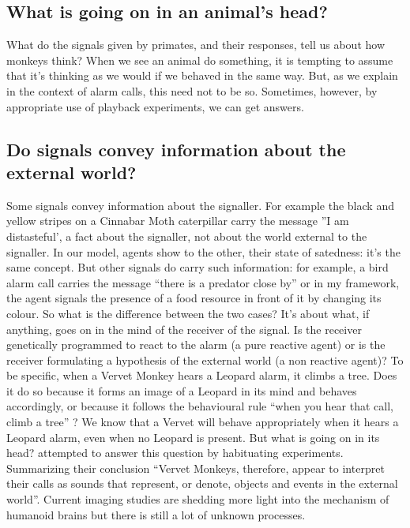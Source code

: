 \subsection{What is going on in an animal's head?}
What do the signals given by primates, and their responses, tell us about how monkeys think?
When we see an animal do something, it is tempting to assume that it's thinking as we
would if we behaved in the same way. But, as we explain in the context of alarm calls,
this need not to be so. Sometimes, however, by appropriate use of playback experiments,
we can get answers.
\subsection{Do signals convey information about the external world?}
Some signals convey information about the signaller. For example the black and yellow
stripes on a Cinnabar Moth caterpillar carry the message ''I am distasteful', a
fact about the signaller, not about the world external to the signaller.
In our model, agents show to the other, their state of satedness: it's the same concept.
But other signals do carry such information: for example, a bird alarm call carries the
message ``there is a predator close by'' or in my framework, the agent signals the
presence of a food resource in front of it by changing its colour. So what is the difference between the two cases?
It's about what, if anything, goes on in the mind of the receiver of the signal.
Is the receiver genetically programmed to react to the alarm (a pure reactive agent) or
is the receiver formulating a hypothesis of the external world (a non reactive agent)?
To be specific, when a Vervet Monkey hears a Leopard alarm, it climbs a tree.
Does it do so because it forms an image of a Leopard in its mind and behaves accordingly,
or because it follows the behavioural rule ``when you hear that call, climb a tree'' ?
We know that a Vervet will behave appropriately when it hears a Leopard alarm,
even when no Leopard is present.
But what is going on in its head? \citet{Seyfarth2000:AwarenessMonkey} attempted
to answer this question by habituating experiments.
Summarizing their conclusion ``Vervet Monkeys, therefore, appear to interpret
their calls as sounds that represent, or denote, objects and events in the external world''.
Current imaging studies are shedding more light into the mechanism of humanoid brains
 but there is still a lot of unknown processes.

